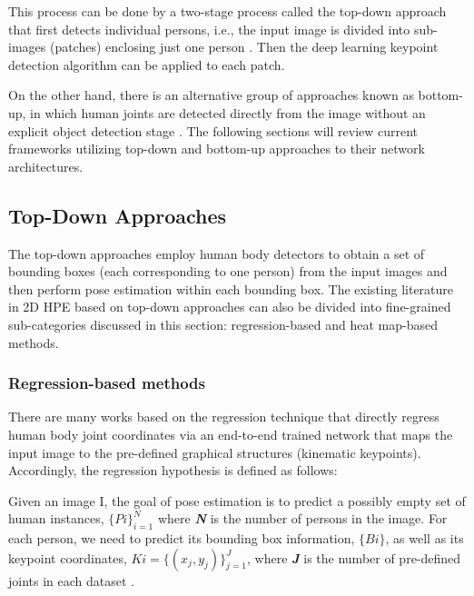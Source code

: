 This process can be done by a two-stage process called the top-down approach that first detects individual persons, i.e., the input image is divided into sub-images (patches) enclosing just one person \cite{sun_deep_2019}. Then the deep learning keypoint detection algorithm can be applied to each patch. 

On the other hand, there is an alternative group of approaches known as bottom-up, in which human joints are detected directly from the image without an explicit object detection stage \cite{cheng_higherhrnet_2020}. The following sections will review current frameworks utilizing top-down and bottom-up approaches to their network architectures.

\subsection{Top-Down Approaches}

The top-down approaches employ human body detectors \cite{ren_faster_2016, micilotta_real-time_2006} to obtain a set of bounding boxes (each corresponding to one person) from the input images and then perform pose estimation within each bounding box. The existing literature in 2D HPE based on top-down approaches can also be divided into fine-grained sub-categories discussed in this section: regression-based and heat map-based methods. 

\subsubsection{Regression-based methods}

There are many works based on the regression technique
\cite{carreira_human_2016, fan_combining_2015, fieraru_learning_2018, li_heterogeneous_2014, qiu_peeking_2020, sun_compositional_2017, sun_integral_2018, toshev_deeppose_2014, wang_graph-pcnn_2020,z} that directly regress human body joint coordinates via an end-to-end trained network that maps the input image to the pre-defined graphical structures (kinematic keypoints). Accordingly, the regression hypothesis is defined as follows:

Given an image I, the goal of pose estimation is to predict a possibly empty set of human instances, $\{Pi\}_{i=1}^N$ where \textbf{\textit{N}} is the number of persons in the image. For each person, we need to predict its bounding box information, $\{Bi\}$, as well as its keypoint coordinates, $Ki=\{(x_j, y_j)\}_{j=1}^J$, where \textbf{\textit{J}} is the number of pre-defined joints in each dataset \cite{li_pose_2021}.

